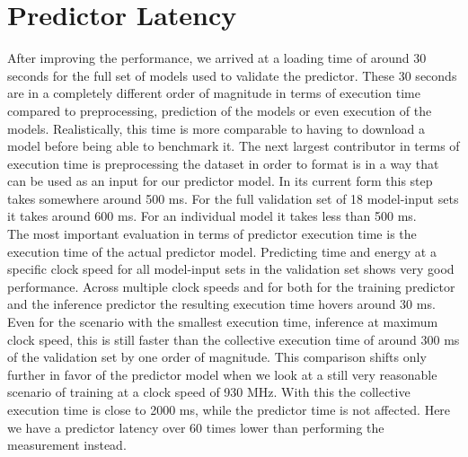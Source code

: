 \section{Predictor Latency}


After improving the performance, we arrived at a loading time of around 30 seconds for the full set of models used to validate the predictor. These 30 seconds are in a completely different order of magnitude in terms of execution time compared to preprocessing, prediction of the models or even execution of the models. Realistically, this time is more comparable to having to download a model before being able to benchmark it. The next largest contributor in terms of execution time is preprocessing the dataset in order to format is in a way that can be used as an input for our predictor model. In its current form this step takes somewhere around 500 ms. For the full validation set of 18 model-input sets it takes around 600 ms. For an individual model it takes less than 500 ms. \\
The most important evaluation in terms of predictor execution time is the execution time of the actual predictor model. Predicting time and energy at a specific clock speed for all model-input sets in the validation set shows very good performance. Across multiple clock speeds and for both for the training predictor and the inference predictor the resulting execution time hovers around 30 ms. Even for the scenario with the smallest execution time, inference at maximum clock speed, this is still faster than the collective execution time of around 300 ms of the validation set by one order of magnitude. This comparison shifts only further in favor of the predictor model when we look at a still very reasonable scenario of training at a clock speed of 930 MHz. With this the collective execution time is close to 2000 ms, while the predictor time is not affected. Here we have a predictor latency over 60 times lower than performing the measurement instead.